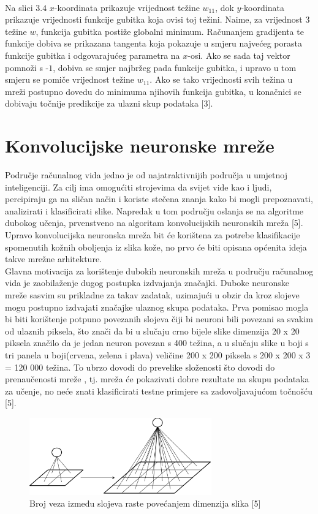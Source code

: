 \documentclass[times, utf8, zavrsni]{fer}
\begin{document}
%
\\
Na slici $3.4$ $x$-koordinata prikazuje vrijednost težine $w_{11}$, dok $y$-koordinata prikazuje vrijednosti funkcije gubitka koja ovisi toj težini. Naime, za vrijednost $3$ težine $w$, funkcija gubitka postiže globalni minimum. Računanjem gradijenta te funkcije dobiva se prikazana tangenta koja pokazuje u smjeru najvećeg porasta funkcije gubitka i odgovarajućeg parametra na $x$-osi. Ako se sada taj vektor pomnoži s -$1$, dobiva se smjer najbržeg pada funkcije gubitka, i upravo u tom smjeru se pomiče vrijednost težine $w_{11}$. Ako se tako vrijednosti svih težina u mreži postupno dovedu do minimuma njihovih funkcija gubitka, u konačnici se dobivaju točnije predikcije za ulazni skup podataka [3].  

\section{Konvolucijske neuronske mreže}
\indent{}
Područje računalnog vida jedno je od najatraktivnijih područja u umjetnoj inteligenciji. Za cilj ima omogućiti strojevima da svijet vide kao i ljudi, percipiraju ga na sličan način i koriste stečena znanja kako bi mogli prepoznavati, analizirati i klasificirati slike. Napredak u tom području oslanja se na algoritme dubokog učenja, prvenstveno na algoritam konvolucijskih neuronskih mreža [5]. Upravo konvolucijska neuronska mreža bit će korištena za potrebe klasifikacije spomenutih kožnih oboljenja iz slika kože, no prvo će biti opisana općenita ideja takve mrežne arhitekture.\\
\indent{}
Glavna motivacija za korištenje dubokih neuronskih mreža u području računalnog vida je zaobilaženje dugog postupka izdvajanja značajki. Duboke neuronske mreže sasvim su prikladne za takav zadatak, uzimajući u obzir da kroz slojeve mogu postupno izdvajati značajke ulaznog skupa podataka. Prva pomisao mogla bi biti korištenje potpuno povezanih slojeva  čiji bi neuroni bili povezani sa svakim od ulaznih piksela, što znači da bi u slučaju crno bijele slike dimenzija 20 x 20 piksela značilo da je jedan neuron povezan s 400 težina, a u slučaju slike u boji s tri panela u boji(crvena, zelena i plava) veličine 200 x  200 piksela s 200 x 200 x 3 = 120 000 težina. To ubrzo dovodi do prevelike složenosti što dovodi do prenaučenosti mreže , tj. mreža će pokazivati dobre rezultate na skupu podataka za učenje, no neće znati klasificirati testne primjere sa zadovoljavajućom točnošću [5].
%
\begin{figure}[!h]
\centering
\includegraphics[width=0.7\textwidth]{./slike/conv2}
\caption{Broj veza između slojeva raste povećanjem dimenzija slika [5]}
\label{fig:conv1}
\end{figure}
\end{document}

